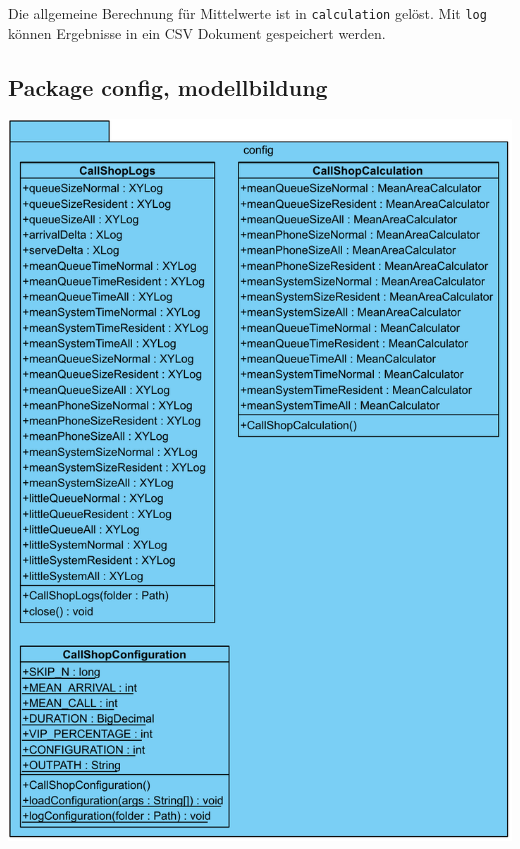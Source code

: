 Die allgemeine Berechnung für Mittelwerte ist in \texttt{calculation} gelöst.
Mit \texttt{log} können Ergebnisse in ein CSV Dokument gespeichert werden.

\subsection{Package config, modellbildung}

\includegraphics[scale=0.5]{abbildungen/uml/config.pdf}
